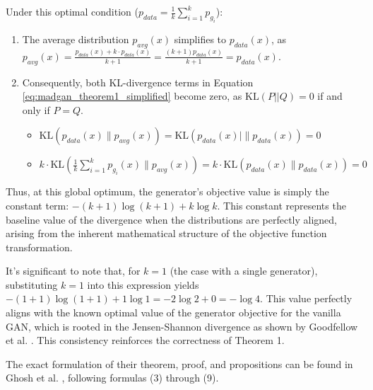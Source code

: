 \noindent
Under this optimal condition (\(p_{data} = \frac{1}{k}\sum_{i=1}^{k} p_{g_i}\)):
\begin{enumerate}
    \item The average distribution \(p_{avg}(x)\) simplifies to \(p_{data}(x)\), as \\\(p_{avg}(x) = \frac{p_{data}(x) + k \cdot p_{data}(x)}{k+1} = \frac{(k+1)p_{data}(x)}{k+1} = p_{data}(x)\).
    \item Consequently, both KL-divergence terms in Equation \ref{eq:madgan_theorem1_simplified} become zero, as \(\text{KL}(P||Q) = 0\) if and only if \(P=Q\).
    \begin{itemize}
        \item \(\text{KL}(p_{data}(x) \| p_{avg}(x)) = \text{KL}(p_{data}(x)|\| p_{data}(x)) = 0\)
        \item \(k \cdot \text{KL}\left(\frac{1}{k}\sum_{i=1}^k p_{g_i}(x) \| p_{avg}(x)\right) = k \cdot \text{KL}(p_{data}(x) \| p_{data}(x)) = 0\)
    \end{itemize}
\end{enumerate}


Thus, at this global optimum, the generator's objective value is simply the constant term: \( -(k+1)\log(k+1) + k\log k \). This constant represents the baseline value of the divergence when the distributions are perfectly aligned, arising from the inherent mathematical structure of the objective function transformation.

It's significant to note that, for \(k=1\) (the case with a single generator), substituting \(k=1\) into this expression yields \( -(1+1)\log(1+1) + 1\log 1 = -2\log 2 + 0 = -\log 4 \). This value perfectly aligns with the known optimal value of the generator objective for the vanilla GAN, which is rooted in the Jensen-Shannon divergence as shown by Goodfellow et al. \cite{goodfellow2014generativeadversarialnetworks}. This consistency reinforces the correctness of Theorem 1.

The exact formulation of their theorem, proof, and propositions can be found in Ghosh et al. \cite{ghosh2018madgan}, following formulas (3) through (9).

